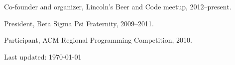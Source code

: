 \documentclass[10pt,letterpaper]{article}
\renewenvironment{itemize}{
  \begin{list}{}{
    \setlength{\leftmargin}{1.5em}
    \setlength{\itemsep}{0.25em}
    \setlength{\parskip}{0pt}
    \setlength{\parsep}{0.25em}
  }
}{
  \end{list}
}
\begin{document}
\begin{itemize}
    \item Co-founder and organizer, Lincoln's Beer and Code meetup, 2012--present.
    \item President, Beta Sigma Psi Fraternity, 2009--2011.
    \item Participant, ACM Regional Programming Competition, 2010.
\end{itemize}

\bigskip

\begin{center}
  \begin{small}
    Last updated: \today
  \end{small}
\end{center}
\end{document}
